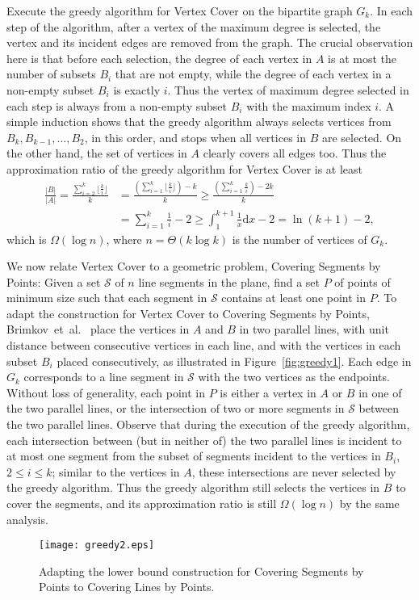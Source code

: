 \documentclass[letterpaper,11pt]{article}
\def\etal{{et~al.}}
\def\S{{\mathcal S}}
\begin{document}
Execute the greedy algorithm for {\sc Vertex Cover} on the bipartite graph $G_k$.
In each step of the algorithm,
after a vertex of the maximum degree is selected,
the vertex and its incident edges are removed from the graph.
The crucial observation here is that before each selection,
the degree of each vertex in $A$ is at most the number of subsets $B_i$
that are not empty,
while the degree of each vertex in a non-empty subset $B_i$ is exactly $i$.
Thus the vertex of maximum degree selected in each step
is always from a non-empty subset $B_i$ with the maximum index $i$.
A simple induction shows that the greedy algorithm always selects vertices
from $B_k, B_{k-1}, \ldots, B_2$, in this order, and stops when all vertices
in $B$ are selected.
On the other hand, the set of vertices in $A$ clearly covers all edges too.
Thus the approximation ratio of the greedy algorithm for Vertex Cover is
at least
\begin{align*}
\frac{|B|}{|A|}
= \frac{\sum_{i=2}^k \lfloor \frac{k}{i} \rfloor}{k}
&= \frac{(\sum_{i=1}^k \lfloor \frac{k}{i} \rfloor)- k}{k}
\ge \frac{(\sum_{i=1}^k \frac{k}{i})- 2 k}{k}\\
&= \sum_{i=1}^k \frac{1}{i} - 2
\ge \int_1^{k+1} \frac{1}{x} \mathrm{d}x - 2
= \ln(k+1) - 2,
\end{align*}
which is $\Omega(\log{n})$, where $n=\Theta(k \log{k})$ is the number
of vertices of $G_k$.

We now relate {\sc Vertex Cover} to a geometric problem, 
{\sc Covering Segments by Points}:
Given a set $\S$ of $n$ line segments in the plane, find a set $P$ of
points of minimum size such that each segment in $\S$ contains at least one point in $P$. 
To adapt the construction for {\sc Vertex Cover} to {\sc Covering Segments by Points},
Brimkov~\etal~\cite{BLWM12} place the vertices in $A$ and $B$ in two parallel
lines, with unit distance between consecutive vertices in each line,
and with the vertices in each subset $B_i$ placed consecutively,
as illustrated in Figure~\ref{fig:greedy1}.
Each edge in $G_k$ corresponds to
a line segment in $\S$ with the two vertices as the endpoints.
Without loss of generality,
each point in $P$ is either a vertex in $A$ or $B$
in one of the two parallel lines,
or the intersection of two or more segments in $\S$
between the two parallel lines.
Observe that during the execution of the greedy algorithm,
each intersection between (but in neither of) the two parallel lines
is incident to at most one segment from the subset of segments
incident to the vertices in $B_i$, $2 \le i \le k$;
similar to the vertices in $A$, these intersections are never selected by
the greedy algorithm.
Thus the greedy algorithm still selects the vertices in $B$
to cover the segments,
and its approximation ratio is still $\Omega(\log{n})$ by the same analysis.
\begin{figure}[htb]
\centering\texttt{[image: greedy2.eps]}
\caption{Adapting the lower bound construction for {\sc Covering Segments by Points} 
to {\sc Covering Lines by Points}.}
\label{fig:greedy2}
\end{figure}
\end{document}
